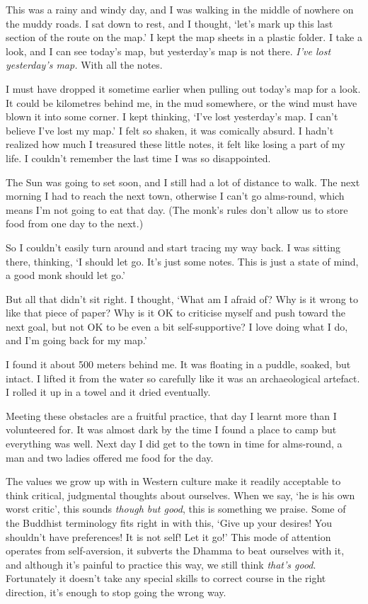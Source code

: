 This was a rainy and windy day, and I was walking in the middle of
nowhere on the muddy roads. I sat down to rest, and I thought, `let's
mark up this last section of the route on the map.' I kept the map
sheets in a plastic folder. I take a look, and I can see today's map,
but yesterday's map is not there. \emph{I've lost yesterday's map.} With
all the notes.

I must have dropped it sometime earlier when pulling out today's map for
a look. It could be kilometres behind me, in the mud somewhere, or the
wind must have blown it into some corner. I kept thinking, `I've lost
yesterday's map. I can't believe I've lost my map.' I felt so shaken, it
was comically absurd. I hadn't realized how much I treasured these
little notes, it felt like losing a part of my life. I couldn't remember
the last time I was so disappointed.

The Sun was going to set soon, and I still had a lot of distance to
walk. The next morning I had to reach the next town, otherwise I can't
go alms-round, which means I'm not going to eat that day. (The monk's
rules don't allow us to store food from one day to the next.)

So I couldn't easily turn around and start tracing my way back. I was
sitting there, thinking, `I should let go. It's just some notes. This is
just a state of mind, a good monk should let go.'

But all that didn't sit right. I thought, `What am I afraid of? Why is
it wrong to like that piece of paper? Why is it OK to criticise myself
and push toward the next goal, but not OK to be even a bit
self-supportive? I love doing what I do, and I'm going back for my map.'

I found it about 500 meters behind me. It was floating in a puddle,
soaked, but intact. I lifted it from the water so carefully like it was
an archaeological artefact. I rolled it up in a towel and it dried
eventually.

Meeting these obstacles are a fruitful practice, that day I learnt more
than I volunteered for. It was almost dark by the time I found a place
to camp but everything was well. Next day I did get to the town in time
for alms-round, a man and two ladies offered me food for the day.

The values we grow up with in Western culture make it readily acceptable
to think critical, judgmental thoughts about ourselves. When we say, `he
is his own worst critic', this sounds \emph{though but good}, this is
something we praise. Some of the Buddhist terminology fits right in with
this, `Give up your desires! You shouldn't have preferences! It is not
self! Let it go!' This mode of attention operates from self-aversion, it
subverts the Dhamma to beat ourselves with it, and although it's painful
to practice this way, we still think \emph{that's good}. Fortunately it
doesn't take any special skills to correct course in the right
direction, it's enough to stop going the wrong way.

